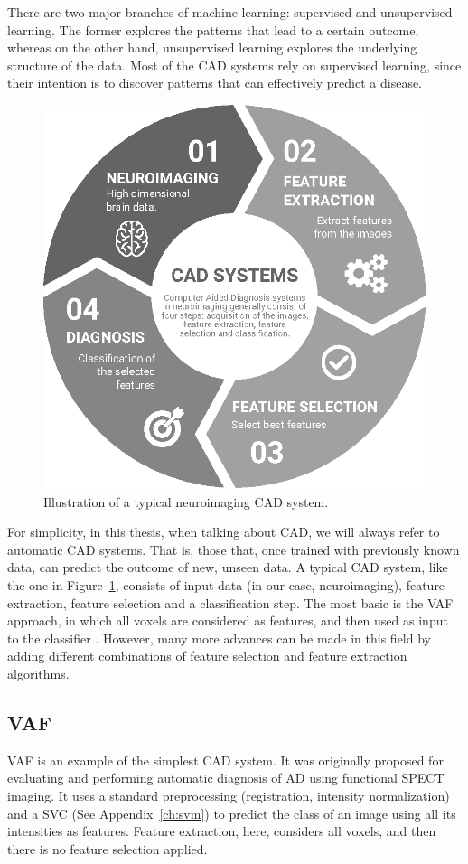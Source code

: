 There are two major branches of machine learning: supervised and unsupervised learning. The former explores the patterns that lead to a certain outcome, whereas on the other hand, unsupervised learning explores the underlying structure of the data. Most of the \ac{CAD} systems rely on supervised learning, since their intention is to discover patterns that can effectively predict a disease. 

\begin{figure}[htp]
	\centering
	\includegraphics[width=0.5\linewidth]{Graphics/ch2/NI-CAD}
	\caption[Illustration of a typical neuroimaging \acs{CAD} system.]{Illustration of a typical neuroimaging \ac{CAD} system.}
	\label{fig:ni-cad}
\end{figure}

For simplicity, in this thesis, when talking about \ac{CAD}, we will always refer to automatic \ac{CAD} systems. That is, those that, once trained with previously known data, can predict the outcome of new, unseen data. A typical \ac{CAD} system, like the one in Figure~\ref{fig:ni-cad}, consists of input data (in our case, neuroimaging), feature extraction, feature selection and a classification step. The most basic is the \acf{VAF} approach, in which all voxels are considered as features, and then used as input to the classifier \cite{Stoeckel04}. However, many more advances can be made in this field by adding different combinations of feature selection and feature extraction algorithms. 

\subsection{\acf{VAF}}
\acf{VAF} \cite{Stoeckel04} is an example of the simplest \ac{CAD} system. It was originally proposed for evaluating and performing automatic diagnosis of \ac{AD} using functional \ac{SPECT} imaging. It uses a standard preprocessing (registration, intensity normalization) and a \ac{SVC} (See Appendix~\ref{ch:svm}) to predict the class of an image using all its intensities as features. Feature extraction, here, considers all voxels, and then there is no feature selection applied. 

